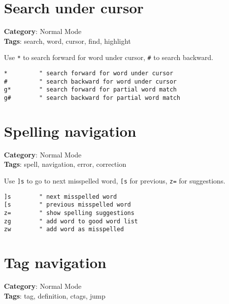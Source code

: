 {{{{{{{{{{\section{Search under cursor}

\textbf{Category}: Normal Mode\\ \textbf{Tags}: search, word, cursor, find, highlight
\vspace{0.5cm}

Use {\footnotesize \Verb§*§} to search forward for word under cursor, {\footnotesize \Verb§#§} to search backward.

\begin{Exa*}{}
\begin{Verbatim}[fontsize=\footnotesize, breaklines, breakanywhere]
*         " search forward for word under cursor
#         " search backward for word under cursor
g*        " search forward for partial word match
g#        " search backward for partial word match
\end{Verbatim}
\end{Exa*}

\section{Spelling navigation}

\textbf{Category}: Normal Mode\\ \textbf{Tags}: spell, navigation, error, correction
\vspace{0.5cm}

Use {\footnotesize \Verb§]s§} to go to next misspelled word, {\footnotesize \Verb§[s§} for previous, {\footnotesize \Verb§z=§} for suggestions.

\begin{Exa*}{}
\begin{Verbatim}[fontsize=\footnotesize, breaklines, breakanywhere]
]s        " next misspelled word
[s        " previous misspelled word
z=        " show spelling suggestions
zg        " add word to good word list
zw        " add word as misspelled
\end{Verbatim}
\end{Exa*}

\section{Tag navigation}

\textbf{Category}: Normal Mode\\ \textbf{Tags}: tag, definition, ctags, jump
\vspace{0.5cm}

}}}}}}}}}}
